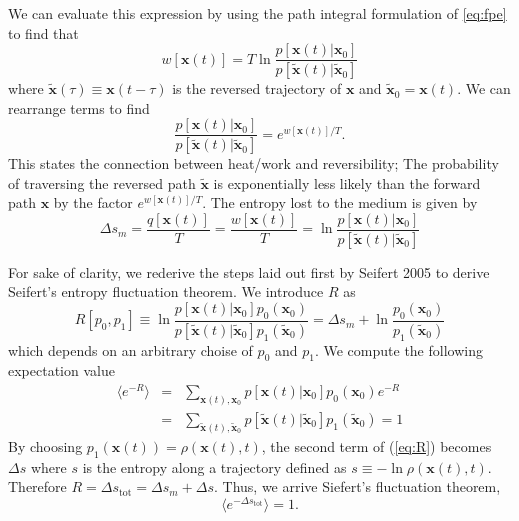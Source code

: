\documentclass[12pt]{article}
\begin{document}
We can evaluate this expression by using the path integral formulation \cite{Kurchan1998a, Seifert2012a, Seifert2005} of \ref{eq:fpe} to find that
\begin{equation}
w[\mathbf{x}(t)]=T\ln \frac{p[\mathbf{x}(t) | \mathbf{x}_{0}]}{p[\tilde{\mathbf{x}}(t) | \tilde{\mathbf{x}}_{0}]}
\end{equation}
where $\tilde{\mathbf{x}}(\tau)\equiv \mathbf{x}(t-\tau)$ is the reversed trajectory of $\mathbf{x}$ and $\tilde{\mathbf{x}}_0=\mathbf{x}(t)$. We can rearrange terms to find \cite{Tolman1924,Crooks1999}
\begin{equation}
\frac{p[\mathbf{x}(t) | \mathbf{x}_{0}]}{p[\tilde{\mathbf{x}}(t) | \tilde{\mathbf{x}}_{0}]}=e^{w[\mathbf{x}(t)]/T}.
\end{equation}
This states the connection between heat/work and reversibility; The probability of traversing the reversed path $\tilde{\mathbf{x}}$ is exponentially less likely than the forward path $\mathbf{x}$ by the factor $e^{w[\mathbf{x}(t)]/T}$. The entropy lost to the medium is given by 
\begin{equation}
\Delta s_{m}=\frac{q[\mathbf{x}(t)]}{T}=\frac{w[\mathbf{x}(t)]}{T}=\ln \frac{p[\mathbf{x}(t) | \mathbf{x}_{0}]}{p[\tilde{\mathbf{x}}(t) | \tilde{\mathbf{x}}_{0}]}
\end{equation}

For sake of clarity, we rederive the steps laid out first by Seifert 2005 \cite{Seifert2005} to derive Seifert's entropy fluctuation theorem. We introduce $R$ as
\begin{equation}
\label{eq:R}
R[p_{0},p_{1}] \equiv \ln \frac{p[\mathbf{x}(t) | \mathbf{x}_{0}]p_0(\mathbf{x}_0)}{p[\tilde{\mathbf{x}}(t) | \tilde{\mathbf{x}}_{0}]p_1(\tilde{\mathbf{x}}_0)} = \Delta s_{m} + \ln \frac{p_0(\mathbf{x}_0)}{p_{1}(\tilde{\mathbf{x}}_0)}
\end{equation}
which depends on an arbitrary choise of $p_0$ and $p_1$. 
We compute the following expectation value
\begin{eqnarray}
\langle e^{-R}\rangle &=& \sum_{\mathbf{x}(t),\mathbf{x}_{0}} p[\mathbf{x}(t)|\mathbf{x}_0]p_{0}(\mathbf{x}_{0})e^{-R} \\
&=& \sum_{\tilde{\mathbf{x}}(t),\tilde{\mathbf{x}}_{0}}  p[\tilde{\mathbf{x}}(t) | \tilde{\mathbf{x}}_{0}]p_1(\tilde{\mathbf{x}}_0) = 1
\end{eqnarray}
By choosing  $p_{1}(\mathbf{x}(t))=\rho(\mathbf{x}(t),t)$, the second term of (\ref{eq:R}) becomes $\Delta s$ where  $s$ is the entropy along a trajectory defined as \cite{Crooks1999,Seifert2005,Qian2002}  $s \equiv -\ln \rho(\mathbf{x}(t),t)$. Therefore $R = \Delta s_{\text{tot}}= \Delta s_m+ \Delta s$.
Thus, we arrive Siefert's fluctuation theorem,
\begin{equation}
\langle e^{- \Delta s_{\text{tot}}}\rangle = 1 .
\end{equation}
\end{document}
